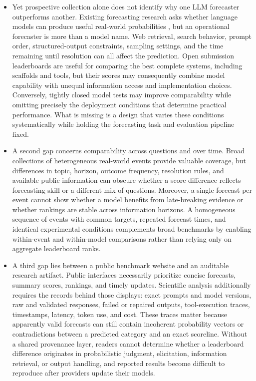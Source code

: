 \documentclass[sigconf,review]{acmart}
\newenvironment{draftbullets}
  {\begin{itemize}[leftmargin=1.25em,itemsep=1.5pt,topsep=2pt,parsep=0pt,partopsep=0pt]}
  {\end{itemize}}
\begin{document}
\begin{draftbullets}
  \item Yet prospective collection alone does not identify why one LLM forecaster outperforms
  another. Existing forecasting research asks whether language models can produce useful real-world
  probabilities \citep{halawi_etal_2024}, but an operational forecaster is more than a model name. Web
  retrieval, search behavior, prompt order, structured-output constraints, sampling settings, and the
  time remaining until resolution can all affect the prediction. Open submission leaderboards are
  useful for comparing the best complete systems, including scaffolds and tools, but their scores may
  consequently combine model capability with unequal information access and implementation choices.
  Conversely, tightly closed model tests may improve comparability while omitting precisely the
  deployment conditions that determine practical performance. What is missing is a design that varies
  these conditions systematically while holding the forecasting task and evaluation pipeline fixed.

  \item A second gap concerns comparability across questions and over time. Broad collections of
  heterogeneous real-world events provide valuable coverage, but differences in topic, horizon,
  outcome frequency, resolution rules, and available public information can obscure whether a score
  difference reflects forecasting skill or a different mix of questions. Moreover, a single forecast
  per event cannot show whether a model benefits from late-breaking evidence or whether rankings are
  stable across information horizons. A homogeneous sequence of events with common targets, repeated
  forecast times, and identical experimental conditions complements broad benchmarks by enabling
  within-event and within-model comparisons rather than relying only on aggregate leaderboard ranks.

  \item A third gap lies between a public benchmark website and an auditable research artifact.
  Public interfaces necessarily prioritize concise forecasts, summary scores, rankings, and timely
  updates. Scientific analysis additionally requires the records behind those displays: exact prompts
  and model versions, raw and validated responses, failed or repaired outputs, tool-execution traces,
  timestamps, latency, token use, and cost. These traces matter because apparently valid forecasts can
  still contain incoherent probability vectors or contradictions between a predicted category and an
  exact scoreline. Without a shared provenance layer, readers cannot determine whether a leaderboard
  difference originates in probabilistic judgment, elicitation, information retrieval, or output
  handling, and reported results become difficult to reproduce after providers update their models.


\end{draftbullets}
\end{document}
